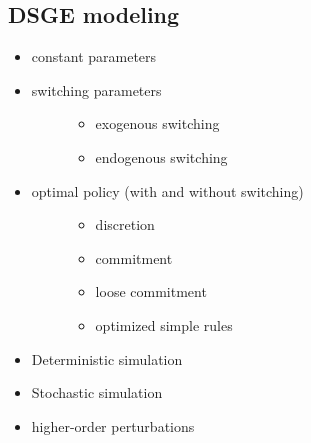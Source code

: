 \documentclass[letterpaper,10pt,english]{sphinxmanual}
\begin{document}
\subsection{DSGE modeling}
\label{intro_folder/rise_capabilities:dsge-modeling}\begin{itemize}
\item {} 
constant parameters

\item {} \begin{description}
\item[{switching parameters}] \leavevmode\begin{itemize}
\item {} 
exogenous switching

\item {} 
endogenous switching

\end{itemize}

\end{description}

\item {} \begin{description}
\item[{optimal policy (with and without switching)}] \leavevmode\begin{itemize}
\item {} 
discretion

\item {} 
commitment

\item {} 
loose commitment

\item {} 
optimized simple rules

\end{itemize}

\end{description}

\item {} 
Deterministic simulation

\item {} 
Stochastic simulation

\item {} 
higher-order perturbations

\end{itemize}
\end{document}
